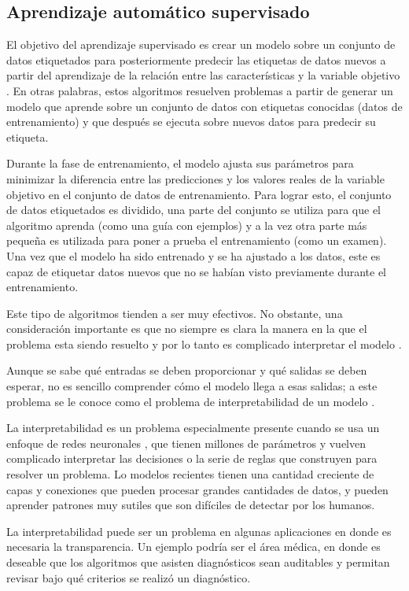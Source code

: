 \subsection{Aprendizaje automático supervisado}
El objetivo del aprendizaje supervisado es crear un modelo sobre un conjunto de datos etiquetados para posteriormente predecir las etiquetas de datos nuevos a partir del aprendizaje de la relación entre las características y la variable objetivo \cite{rebala_introduction_2019}. En otras palabras, estos algoritmos resuelven problemas a partir de generar un modelo que aprende sobre un conjunto de datos con etiquetas conocidas (datos de entrenamiento) y que después se ejecuta sobre nuevos datos para predecir su etiqueta. 

Durante la fase de entrenamiento, el modelo ajusta sus parámetros para minimizar la diferencia entre las predicciones y los valores reales de la variable objetivo en el conjunto de datos de entrenamiento. Para lograr esto, el conjunto de datos etiquetados es dividido, una parte del conjunto se utiliza para que el algoritmo aprenda (como una guía con ejemplos) y a la vez otra parte más pequeña es utilizada para poner a prueba el entrenamiento (como un examen). Una vez que el modelo ha sido entrenado y se ha ajustado a los datos, este es capaz de etiquetar datos nuevos que no se habían visto previamente durante el entrenamiento. 

Este tipo de algoritmos tienden a ser muy efectivos. No obstante, una consideración importante es que no siempre es clara la manera en la que el problema esta siendo resuelto y por lo tanto es complicado interpretar el modelo \cite{rebala_introduction_2019}. 

Aunque se sabe qué entradas se deben proporcionar y qué salidas se deben esperar, no es sencillo comprender cómo el modelo llega a esas salidas; a este problema se le conoce como el problema de interpretabilidad de un modelo \cite{zhang_survey_2021, rebala_introduction_2019}. 

La interpretabilidad es un problema especialmente presente cuando se usa un enfoque de redes neuronales \cite{zhang_survey_2021}, que tienen millones de parámetros y vuelven complicado interpretar las decisiones o la serie de reglas que construyen para resolver un problema. Lo modelos recientes tienen una cantidad creciente de capas y conexiones que pueden procesar grandes cantidades de datos, y pueden aprender patrones muy sutiles que son difíciles de detectar por los humanos. 

La interpretabilidad puede ser un problema en algunas aplicaciones en donde es necesaria la transparencia. Un ejemplo podría ser el área médica, en donde es deseable que los algoritmos que asisten diagnósticos sean auditables y permitan revisar bajo qué criterios se realizó un diagnóstico.

